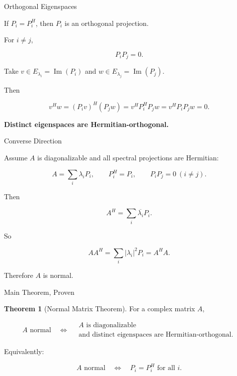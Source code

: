 \documentclass[10pt]{beamer}
\theoremstyle{definition}
\newtheorem{thm}{Theorem}[section]
\newcommand{\x}[1]{\alert{\textbf{#1}}}
\begin{document}
\begin{frame}{Orthogonal Eigenspaces}

If $P_i=P_i^H$, then $P_i$ is an orthogonal projection.

\vfill

For $i\ne j$,

$$
P_iP_j=0.
$$

\vfill

Take $v\in E_{\lambda_i}=\operatorname{Im}(P_i)$ and $w\in E_{\lambda_j}=\operatorname{Im}(P_j)$.

Then

$$
v^Hw
=(P_iv)^H(P_jw)
=v^HP_i^HP_jw
=v^HP_iP_jw=0.
$$

\vfill

\begin{center}
\x{Distinct eigenspaces are Hermitian-orthogonal.}
\end{center}

\end{frame}

\begin{frame}{Converse Direction}

Assume $A$ is diagonalizable and all spectral projections are Hermitian:

$$
A=\sum_i\lambda_iP_i,
\qquad
P_i^H=P_i,
\qquad
P_iP_j=0\ (i\ne j).
$$

\vfill

Then

$$
A^H=\sum_i\overline{\lambda_i}P_i.
$$

\vfill

So

$$
AA^H=\sum_i|\lambda_i|^2P_i
=A^HA.
$$

\vfill

Therefore $A$ is normal.

\end{frame}

\begin{frame}{Main Theorem, Proven}

\begin{thm}[Normal Matrix Theorem]
For a complex matrix $A$,

$$
A\text{ normal}
\quad\Longleftrightarrow\quad
\begin{array}{c}
A\text{ is diagonalizable}\\
\text{and distinct eigenspaces are Hermitian-orthogonal.}
\end{array}
$$
\end{thm}

\vfill

Equivalently:

$$
\boxed{
A\text{ normal}
\quad\Longleftrightarrow\quad
P_i=P_i^H\text{ for all }i.
}
$$

\end{frame}
\end{document}
